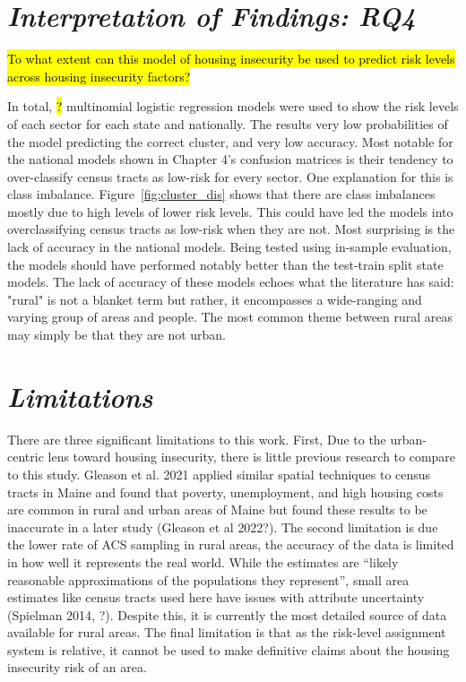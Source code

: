 \section{\textit{Interpretation of Findings: RQ4}}
\hl{To what extent can this model of housing insecurity be used to predict risk levels across housing insecurity factors?}

In total, \hl{?} multinomial logistic regression models were used to show the risk levels of each sector for each state and nationally. The results  very low probabilities of the model predicting the correct cluster, and very low accuracy. Most notable for the national models shown in Chapter 4's confusion matrices is their tendency to over-classify census tracts as low-risk for every sector. One explanation for this is class imbalance. Figure~\ref{fig:cluster_dis} shows that there are class imbalances mostly due to high levels of lower risk levels. This could have led the models into overclassifying census tracts as low-risk when they are not. Most surprising is the lack of accuracy in the national models. Being tested using in-sample evaluation, the models should have performed notably better than the test-train split state models. The lack of accuracy of these models echoes what the literature has said: "rural" is not a blanket term but rather, it encompasses a wide-ranging and varying group of areas and people. The most common theme between rural areas may simply be that they are not urban. 


\section{\textit{Limitations}}

There are three significant limitations to this work. First, Due to the urban-centric lens toward housing insecurity, there is little previous research to compare to this study. Gleason et al. 2021 applied similar spatial techniques to census tracts in Maine and found that poverty, unemployment, and high housing costs are common in rural and urban areas of Maine but found these results to be inaccurate in a later study (Gleason et al 2022?). The second limitation is due the lower rate of ACS sampling in rural areas, the accuracy of the data is limited in how well it represents the real world. While the estimates are “likely reasonable approximations of the populations they represent”, small area estimates like census tracts used here have issues with attribute uncertainty (Spielman 2014, ?). Despite this, it is currently the most detailed source of data available for rural areas. The final limitation is that as the risk-level assignment system is relative, it cannot be used to make definitive claims about the housing insecurity risk of an area.  

